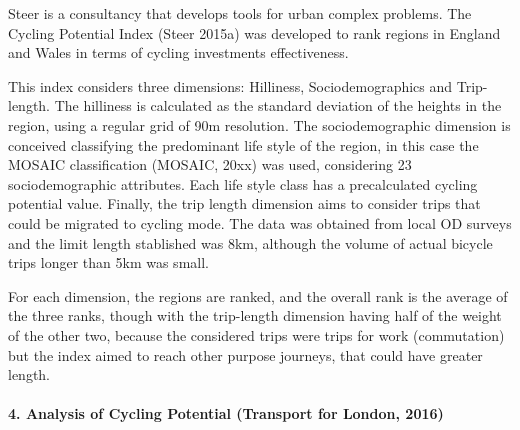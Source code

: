 \documentclass[a4paper]{article}
\begin{document}
Steer is a consultancy that develops tools for urban complex problems. The Cycling Potential Index (Steer 2015a) was developed to rank regions in England and Wales in terms of cycling investments effectiveness.

This index considers three dimensions: Hilliness, Sociodemographics and Trip-length. The hilliness is calculated as the standard deviation of the heights in the region, using a regular grid of 90m resolution. The sociodemographic dimension is conceived classifying the predominant life style of the region, in this case the MOSAIC classification (MOSAIC, 20xx) was used, considering 23 sociodemographic attributes. Each life style class has a precalculated cycling potential value. Finally, the trip length dimension aims to consider trips that could be migrated to cycling mode. The data was obtained from local OD surveys and the limit length stablished was 8km, although the volume of actual bicycle trips longer than 5km was small.

For each dimension, the regions are ranked, and the overall rank is the average of the three ranks, though with the trip-length dimension having half of the weight of the other two, because the considered trips were trips for work (commutation) but the index aimed to reach other purpose journeys, that could have greater length. 

\paragraph{4. Analysis of Cycling Potential (Transport for London, 2016) }



 
 
 
\end{document}
